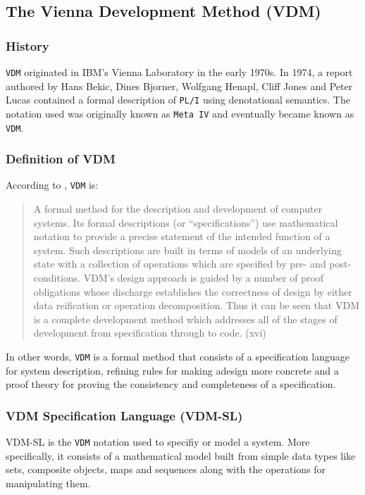 \documentclass[11pt]{article}
\begin{document}
\subsection{The Vienna Development Method (VDM)}

\subsubsection{History}

{\tt VDM} originated in IBM's Vienna Laboratory in the early 1970s.  In 1974, a report authored by Hans Bekic, Dines Bjorner, Wolfgang Henapl, Cliff Jones and Peter Lucas contained a formal description of {\tt PL/I} using denotational semantics.  The notation used was originally known as {\tt Meta IV} and eventually became known as {\tt VDM}.

\subsubsection{Definition of VDM}

According to \cite{VDM}, {\tt VDM} is:
\begin{quote}
A formal method for the description and development of computer systems.  Its formal descriptions (or ``specifications'') use mathematical notation to provide a precise statement of the intended function of a system.  Such descriptions are built in terms of models of an underlying state with a collection of operations which are specified by pre- and post- conditions.  VDM's design approach is guided by a number of proof obligations whose discharge establishes the correctness of design by either data reification or operation decomposition.  Thus it can be seen that VDM is a complete development method which addresses all of the stages of development from specification through to code.  (xvi)
\end{quote}

In other words, {\tt VDM} is a formal method that consists of a specification language for system description, refining rules for making adesign more concrete and a proof theory for proving the consistency and completeness of a specification.

\subsubsection{VDM Specification Language (VDM-SL)}

VDM-SL is the {\tt VDM} notation used to specifiy or model a system.  More specifically, it consists of a mathematical model built from simple data types like sets, composite objects, maps and sequences along with the operations for manipulating them.\\
\end{document}
